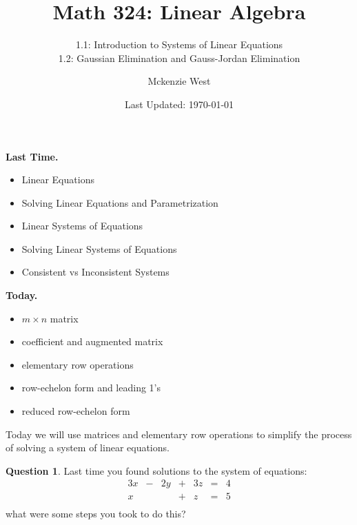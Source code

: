 \documentclass[handout]{beamer}
\theoremstyle{definition}
\newtheorem{question}[exercise]{Question}
\begin{document}
	\title{Math 324: Linear Algebra}
	\subtitle{1.1: Introduction to Systems of Linear Equations\\1.2: Gaussian Elimination and Gauss-Jordan Elimination}
	\author{Mckenzie West}
	\date{Last Updated: \today}
\begin{frame}
\maketitle
\end{frame}

\begin{frame}{\insertframenumber}
	\begin{block}{\textbf{Last Time.}}
	\begin{itemize}[label=--]
		\item Linear Equations
		\item Solving Linear Equations and Parametrization
		\item Linear Systems of Equations
		\item Solving Linear Systems of Equations
		\item Consistent vs Inconsistent Systems
	\end{itemize}
	\end{block}
	\begin{block}{\textbf{Today.}}
	\begin{itemize}[label=--]
		\item $m\times n$ matrix
		\item coefficient and augmented matrix
		\item elementary row operations
		\item row-echelon form and leading 1's
		\item reduced row-echelon form
	\end{itemize}
	\end{block}
\end{frame}



\begin{frame}{\insertframenumber}
	Today we will use matrices and elementary row operations to simplify the process of solving a system of linear equations.
\end{frame}

\begin{frame}{\insertframenumber}
	\begin{question}
		Last time you found solutions to the system of equations:
		\[\begin{array}{rcrcrcl}
		3x&-&2y&+&3z&=&4\\
		x&&&+&z&=&5\\
		\end{array}\]
		what were some steps you took to do this?
	\end{question}
\end{frame}
\end{document}
